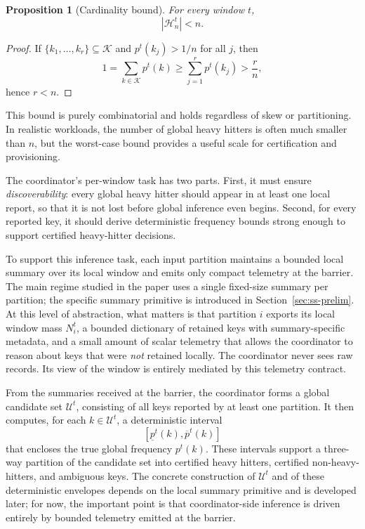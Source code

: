 \documentclass[sigconf, nonacm]{acmart}
\newtheorem{proposition}{Proposition}
\begin{document}
\begin{proposition}[Cardinality bound]
\label{prop:hh-count}
For every window \(t\),
\[
|\mathcal{H}_n^t| < n.
\]
\end{proposition}

\begin{proof}
If \(\{k_1,\dots,k_r\} \subseteq \mathcal{K}\) and \(p^t(k_j) > 1/n\) for all \(j\), then
\[
1
=
\sum_{k \in \mathcal{K}} p^t(k)
\ge
\sum_{j=1}^r p^t(k_j)
>
\frac{r}{n},
\]
hence \(r < n\).
\end{proof}

This bound is purely combinatorial and holds regardless of skew or partitioning. In realistic workloads, the number of global heavy hitters is often much smaller than \(n\), but the worst-case bound provides a useful scale for certification and provisioning.

The coordinator's per-window task has two parts. First, it must ensure \emph{discoverability}: every global heavy hitter should appear in at least one local report, so that it is not lost before global inference even begins. Second, for every reported key, it should derive deterministic frequency bounds strong enough to support certified heavy-hitter decisions.

To support this inference task, each input partition maintains a bounded local summary over its local window and emits only compact telemetry at the barrier. The main regime studied in the paper uses a single fixed-size summary per partition; the specific summary primitive is introduced in Section~\ref{sec:ss-prelim}. At this level of abstraction, what matters is that partition \(i\) exports its local window mass \(N_i^t\), a bounded dictionary of retained keys with summary-specific metadata, and a small amount of scalar telemetry that allows the coordinator to reason about keys that were \emph{not} retained locally. The coordinator never sees raw records. Its view of the window is entirely mediated by this telemetry contract.

From the summaries received at the barrier, the coordinator forms a global candidate set \(\mathcal{U}^t\), consisting of all keys reported by at least one partition. It then computes, for each \(k \in \mathcal{U}^t\), a deterministic interval
\[
[\underline p^t(k), \overline p^t(k)]
\]
that encloses the true global frequency \(p^t(k)\). These intervals support a three-way partition of the candidate set into certified heavy hitters, certified non-heavy-hitters, and ambiguous keys. The concrete construction of \(\mathcal{U}^t\) and of these deterministic envelopes depends on the local summary primitive and is developed later; for now, the important point is that coordinator-side inference is driven entirely by bounded telemetry emitted at the barrier.
\end{document}
